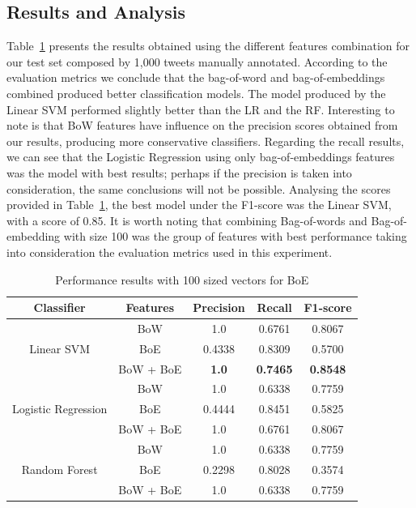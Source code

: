 \subsection{Results and Analysis}
Table~\ref{classifiers} presents the results obtained using the different features combination for our test set composed by 1,000 tweets manually annotated. According to the evaluation metrics we conclude that the bag-of-word and bag-of-embeddings combined produced better classification models. The model produced by the Linear SVM performed slightly better than the LR and the RF. Interesting to note is that BoW features have influence on the precision scores obtained from our results, producing more conservative classifiers. Regarding the recall results, we can see that the Logistic Regression using only bag-of-embeddings features was the model with best results; perhaps if the precision is taken into consideration, the same conclusions will not be possible. Analysing the scores provided in Table~\ref{classifiers}, the best model under the F1-score was the Linear SVM, with a score of 0.85. It is worth noting that combining Bag-of-words and Bag-of-embedding with size 100 was the group of features with best performance taking into consideration the evaluation metrics used in this experiment.

\begin{table}[!htbp]
\footnotesize
\centering
\caption{Performance results with 100 sized vectors for BoE}
\label{classifiers}
\begin{tabular}{|c|c|c|c|c|}
\hline
\textbf{Classifier}                  & \textbf{Features} & \textbf{Precision} & \textbf{Recall} & \textbf{F1-score} \\ \hline
\multirow{3}{*}{Linear SVM}          & BoW               & 1.0                & 0.6761          & 0.8067            \\
                                     & BoE               & 0.4338             & 0.8309          & 0.5700            \\
                                     & BoW + BoE         & \textbf{1.0}       & \textbf{0.7465} & \textbf{0.8548}   \\ \hline
\multirow{3}{*}{Logistic Regression} & BoW               & 1.0                & 0.6338          & 0.7759            \\
                                     & BoE               & 0.4444             & 0.8451          & 0.5825            \\
                                     & BoW + BoE         & 1.0                & 0.6761          & 0.8067            \\ \hline
\multirow{3}{*}{Random Forest}       & BoW               & 1.0                & 0.6338          & 0.7759            \\
                                     & BoE               & 0.2298             & 0.8028          & 0.3574            \\
                                     & BoW + BoE         & 1.0                & 0.6338          & 0.7759            \\ \hline
\end{tabular}
\end{table}

